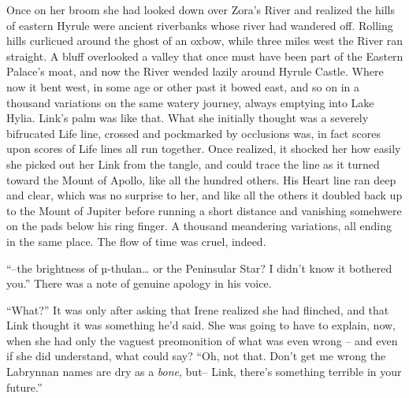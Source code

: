 \documentclass[../FGP.tex]{subfiles}
\begin{document}
\begin{fragment}
Once on her broom she had looked down over Zora's River and realized the hills of eastern Hyrule were ancient riverbanks whose river had wandered off.%
    \normalmarginpar{}
Rolling hills curlicued around the ghost of an oxbow, while three miles west the River ran straight. A bluff overlooked a valley that once must have been part of the Eastern Palace's moat, and now the River wended lazily around Hyrule Castle. Where now it bent west, in some age or other past it bowed east, and so on in a thousand variations on the same watery journey, always emptying into Lake Hylia. Link's palm was like that. What she initially thought was a severely bifrucated Life line, crossed and pockmarked by occlusions was, in  fact scores upon scores of Life lines all run together. Once realized, it shocked her how easily she picked out her Link%
    \reversemarginpar{}
from the tangle, and could trace the line as it turned toward the Mount of Apollo, like all the hundred others. His Heart line ran deep and clear, which was no surprise to her, and like all the others it doubled back up to the Mount of Jupiter before running a short distance and vanishing somehwere on the pads below his ring finger. A thousand meandering variations, all ending in the same place. The flow of time was cruel, indeed.

\normalmarginpar``--the brightness of {\Gr µ}-thulan\ldots{} or the Peninsular Star? I didn't know it bothered you.'' There was a note of genuine apology in his voice.

``What?'' It was only after asking that Irene realized she had flinched, and that Link thought it was something he'd said. She was going to have to explain, now, when she had only the vaguest preomonition of what was even wrong -- and even if she did understand, what could say? ``Oh, not that. Don't get me wrong the Labrynnan names are dry as a \emph{bone}, but-- Link, there's something terrible in your future.''  


\end{fragment}
\end{document}
